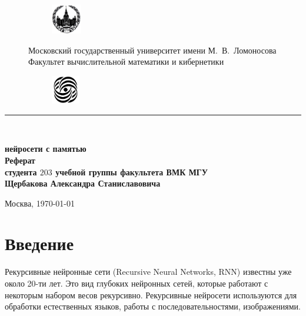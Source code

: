 \documentclass[14pt]{article}
\begin{document}
\begin{titlepage}

\newcommand{\HRule}{\rule{\linewidth}{0.5mm}} 
\centering 

\begin{figure}
    \centering
    \begin{subfigure}{1.5cm}
       \includegraphics[height=1.3cm]{msu.jpg}
    \end{subfigure}
    \parbox[t][0.2cm][c]{12cm}{
        \centering
        \large Московский государственный университет имени М.~В.~Ломоносова\\[0.5cm]
        \normalsize Факультет вычислительной математики и кибернетики
    }
    \begin{subfigure}{1.25cm}    
        \includegraphics[height=1.25cm]{cmc.jpg}
    \end{subfigure}
\end{figure}



\HRule \\[5cm]
{
 \bfseries \upshape
{ \Huge  {} нейросети с памятью\guillemotright }\\[0.2cm]
{\LARGE Реферат}\\[0.2cm]

{
\large
\vspace{1cm}
студента $203$ учебной группы факультета ВМК МГУ \\
Щербакова Александра Станиславовича
}

\vspace{9cm}
{\large Москва, \today}
} 


\vfill

\end{titlepage}

\tableofcontents
\pagebreak
\section{Введение}

\large
Рекурсивные нейронные сети (Recursive Neural Networks, RNN) известны уже около 20-ти лет. Это вид глубоких нейронных сетей, которые работают с некоторым набором весов рекурсивно. Рекурсивные нейросети используются для обработки естественных языков, работы с последовательностями, изображениями.
\end{document}
